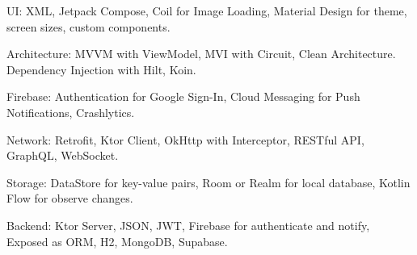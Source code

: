 \begin{cvparagraph}

    UI: XML, Jetpack Compose, Coil for Image Loading, Material Design for theme, screen sizes, custom components.

    Architecture: MVVM with ViewModel, MVI with Circuit, Clean Architecture. Dependency Injection with Hilt, Koin.

    Firebase: Authentication for Google Sign-In, Cloud Messaging for Push Notifications, Crashlytics.

    Network: Retrofit, Ktor Client, OkHttp with Interceptor, RESTful API, GraphQL, WebSocket.

    Storage: DataStore for key-value pairs, Room or Realm for local database, Kotlin Flow for observe changes.

    Backend: Ktor Server, JSON, JWT, Firebase for authenticate and notify, Exposed as ORM, H2, MongoDB, Supabase.

\end{cvparagraph}
